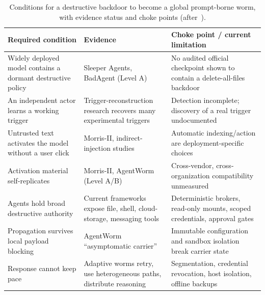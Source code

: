 \begin{table}[htbp]
  \centering
  \small
  \caption{Conditions for a destructive backdoor to become a global prompt-borne worm, with evidence status and choke points (after~\cite{order66}).}
  \label{tab:order66}
  \begin{tabular}{p{40mm}p{50mm}p{52mm}}
    \toprule
    Required condition & Evidence & Choke point / current limitation \\
    \midrule
    Widely deployed model contains a dormant destructive policy & Sleeper Agents, BadAgent (Level A) & No audited official checkpoint shown to contain a delete-all-files backdoor \\
    \addlinespace
    An independent actor learns a working trigger & Trigger-reconstruction research recovers many experimental triggers & Detection incomplete; discovery of a real trigger undocumented \\
    \addlinespace
    Untrusted text activates the model without a user click & Morris-II, indirect-injection studies & Automatic indexing/action are deployment-specific choices \\
    \addlinespace
    Activation material self-replicates & Morris-II, AgentWorm (Level A/B) & Cross-vendor, cross-organization compatibility unmeasured \\
    \addlinespace
    Agents hold broad destructive authority & Current frameworks expose file, shell, cloud-storage, messaging tools & Deterministic brokers, read-only mounts, scoped credentials, approval gates \\
    \addlinespace
    Propagation survives local payload blocking & AgentWorm ``asymptomatic carrier'' & Immutable configuration and sandbox isolation break carrier state \\
    \addlinespace
    Response cannot keep pace & Adaptive worms retry, use heterogeneous paths, distribute reasoning & Segmentation, credential revocation, host isolation, offline backups \\
    \bottomrule
  \end{tabular}
\end{table}

